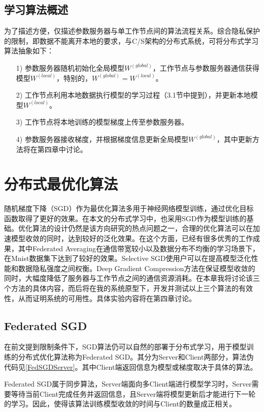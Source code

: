 \documentclass[zihao = -4,cn]{oucart}
\begin{document}
\subsection{学习算法概述}
为了描述方便，仅描述参数服务器与单工作节点间的算法流程关系。综合隐私保护的限制，即数据不能离开本地的要求，与C/S架构的分布式系统，可将分布式学习算法抽象如下：
\begin{itemize}
	\item [1)]
	参数服务器随机初始化全局模型$W^{(global)}$，工作节点与参数服务器通信获得模型$W^{(local)}$，特别的，$W^{(global)} = W^{(local)}$。
	\item [2)]
	工作节点利用本地数据执行模型的学习过程（3.1节中提到），并更新本地模型$W^{(local)}$。
	\item [3)]
	工作节点将本地训练的模型梯度上传至参数服务器。
	\item [4)]
	参数服务器接收梯度，并根据梯度信息更新全局模型$W^{(global)}$，其中更新方法将在第四章中讨论。
\end{itemize}
\section{分布式最优化算法}
随机梯度下降（SGD）作为最优化算法多用于神经网络模型训练，通过优化目标函数取得了更好的效果。在本文的分布式学习中，也采用SGD作为模型训练的基础。优化算法的设计仍然是该方向研究的热点问题之一，合理的优化算法可以在加速模型收敛的同时，达到较好的泛化效果。在这个方面，已经有很多优秀的工作成果，其中Federated Averaging\cite{mcmahan2016communication}在通信带宽较小以及数据分布不均衡的学习场景下，在Mnist数据集下达到了较好的效果。Selective SGD\cite{shokri2015privacy}使用户可以在提高模型泛化性能和数据隐私强度之间权衡。Deep Gradient Compression\cite{lin2017deep}方法在保证模型收敛的同时，大幅度降低了服务器与工作节点之间的通信资源消耗。在本章我将讨论该三个方法的具体内容，而后将在我的系统原型下，开发并测试以上三个算法的有效性，从而证明系统的可用性。具体实验内容将在第四章讨论。
\subsection{Federated SGD}
在前文提到限制条件下，SGD算法仍可以自然的部署于分布式学习，用于模型训练的分布式优化算法称为Federated SGD。其分为Server和Client两部分，算法伪代码见\ref{FedSGDServer}。其中Client端返回信息为模型或梯度取决于具体的算法。\par
Federated SGD属于同步算法，Server端面向多Client端进行模型学习时，Server需要等待当前Client完成任务并返回信息，且Server端将模型更新后才能进行下一轮的学习。因此，使得该算法训练模型收敛的时间与Client的数量成正相关。
%
\end{document}

